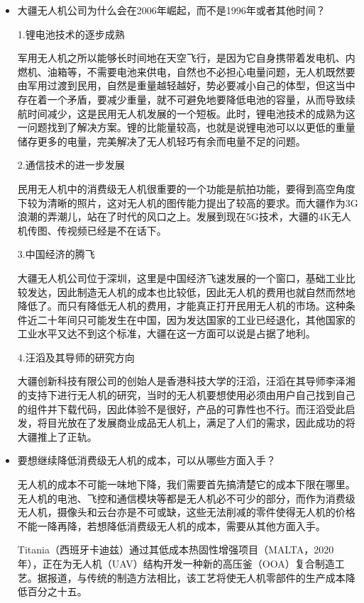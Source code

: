 \documentclass{article}
\begin{document}
\begin{itemize}
    \item 大疆无人机公司为什么会在2006年崛起，而不是1996年或者其他时间？\par
    1.锂电池技术的逐步成熟\par
    军用无人机之所以能够长时间地在天空飞行，是因为它自身携带着发电机、内燃机、油箱等，不需要电池来供电，自然也不必担心电量问题，无人机既然要由军用过渡到民用，自然是重量越轻越好，势必要减小自己的体型，但这当中存在着一个矛盾，要减少重量，就不可避免地要降低电池的容量，从而导致续航时间减少，这是民用无人机发展的一个短板。此时，锂电池技术的成熟为这一问题找到了解决方案。锂的比能量较高，也就是说锂电池可以以更低的重量储存更多的电量，完美解决了无人机轻巧有余而电量不足的问题。\par
     2.通信技术的进一步发展\par
    民用无人机中的消费级无人机很重要的一个功能是航拍功能，要得到高空角度下较为清晰的照片，这对无人机的图传能力提出了较高的要求。而大疆作为3G浪潮的弄潮儿，站在了时代的风口之上。发展到现在5G技术，大疆的4K无人机传图、传视频已经是不在话下。\par
    3.中国经济的腾飞\par
    大疆无人机公司位于深圳，这里是中国经济飞速发展的一个窗口，基础工业比较发达，因此制造无人机的成本也比较低，因此无人机的费用也就自然而然地降低了。而只有降低无人机的费用，才能真正打开民用无人机的市场。这种条件近二十年间只可能发生在中国，因为发达国家的工业已经退化，其他国家的工业水平又达不到这个标准，大疆在这一方面可以说是占据了地利。\par
    4.汪滔及其导师的研究方向\par
    大疆创新科技有限公司的创始人是香港科技大学的汪滔，汪滔在其导师李泽湘的支持下进行无人机的研究，当时的无人机要想使用必须由用户自己找到自己的组件并下载代码，因此体验不是很好，产品的可靠性也不行。而汪滔受此启发，将目光放在了发展商业成品无人机上，满足了人们的需求，因此成功的将大疆推上了正轨。\par
    \item 要想继续降低消费级无人机的成本，可以从哪些方面入手？\par
    无人机的成本不可能一味地下降，我们需要首先搞清楚它的成本下限在哪里。无人机的电池、飞控和通信模块等都是无人机必不可少的部分，而作为消费级无人机，摄像头和云台亦是不可或缺，这些无法削减的零件使得无人机的价格不能一降再降，若想降低消费级无人机的成本，需要从其他方面入手。\par
    Titania（西班牙卡迪兹）通过其低成本热固性增强项目（MALTA，2020年），正在为无人机（UAV）结构开发一种新的高压釜（OOA）复合制造工艺。据报道，与传统的制造方法相比，该工艺将使无人机零部件的生产成本降低百分之十五。\citep{a6}\par

\end{itemize}
\end{document}

